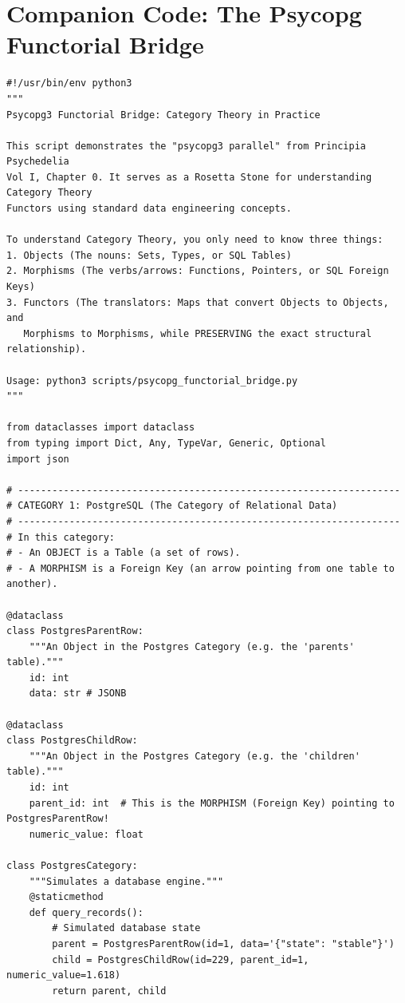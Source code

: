 \section*{Companion Code: The Psycopg Functorial Bridge}

\begin{verbatim}
#!/usr/bin/env python3
"""
Psycopg3 Functorial Bridge: Category Theory in Practice

This script demonstrates the "psycopg3 parallel" from Principia Psychedelia
Vol I, Chapter 0. It serves as a Rosetta Stone for understanding Category Theory 
Functors using standard data engineering concepts.

To understand Category Theory, you only need to know three things:
1. Objects (The nouns: Sets, Types, or SQL Tables)
2. Morphisms (The verbs/arrows: Functions, Pointers, or SQL Foreign Keys)
3. Functors (The translators: Maps that convert Objects to Objects, and 
   Morphisms to Morphisms, while PRESERVING the exact structural relationship).

Usage: python3 scripts/psycopg_functorial_bridge.py
"""

from dataclasses import dataclass
from typing import Dict, Any, TypeVar, Generic, Optional
import json

# -------------------------------------------------------------------
# CATEGORY 1: PostgreSQL (The Category of Relational Data)
# -------------------------------------------------------------------
# In this category:
# - An OBJECT is a Table (a set of rows).
# - A MORPHISM is a Foreign Key (an arrow pointing from one table to another).

@dataclass
class PostgresParentRow:
    """An Object in the Postgres Category (e.g. the 'parents' table)."""
    id: int
    data: str # JSONB

@dataclass
class PostgresChildRow:
    """An Object in the Postgres Category (e.g. the 'children' table)."""
    id: int
    parent_id: int  # This is the MORPHISM (Foreign Key) pointing to PostgresParentRow!
    numeric_value: float

class PostgresCategory:
    """Simulates a database engine."""
    @staticmethod
    def query_records():
        # Simulated database state
        parent = PostgresParentRow(id=1, data='{"state": "stable"}')
        child = PostgresChildRow(id=229, parent_id=1, numeric_value=1.618)
        return parent, child


\end{verbatim}
